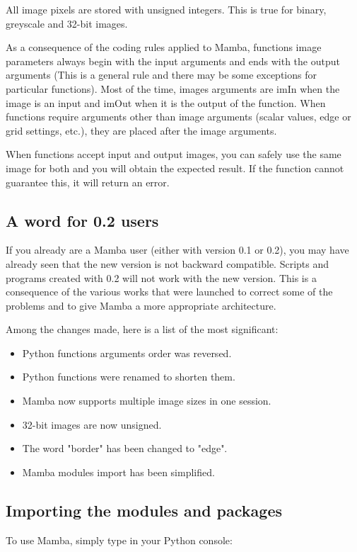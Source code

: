 \documentclass[a4paper,10pt,oneside]{article}
\begin{document}
All image pixels are stored with unsigned integers. This is true for binary,
greyscale and 32-bit images.

As a consequence of the coding rules applied to Mamba, functions image parameters
always begin with the input arguments and ends with the output arguments (This 
is a general rule and there may be some exceptions for particular functions).
Most of the time, images arguments are imIn when the image is an input and imOut
when it is the output of the function. When functions require arguments other than 
image arguments (scalar values, edge or grid settings, etc.), they are placed after 
the image arguments.

When functions accept input and output images, you can safely use the same image
for both and you will obtain the expected result. If the function cannot 
guarantee this, it will return an error.

\subsection{A word for 0.2 users}

If you already are a Mamba user (either with version 0.1 or 0.2), you may have 
already seen that the new version is not backward compatible. Scripts
and programs created with 0.2 will not work with the new version. This is a 
consequence of the various works that were launched to correct some of the 
problems and to give Mamba a more appropriate architecture.

Among the changes made, here is a list of the most significant:
\begin{itemize}
\item Python functions arguments order was reversed.
\item Python functions were renamed to shorten them.
\item Mamba now supports multiple image sizes in one session.
\item 32-bit images are now unsigned.
\item The word "border" has been changed to "edge".
\item Mamba modules import has been simplified.
\end{itemize}

\subsection{Importing the modules and packages}

To use Mamba, simply type in your Python console:
\end{document}
